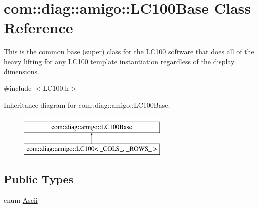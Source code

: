 \hypertarget{classcom_1_1diag_1_1amigo_1_1LC100Base}{
\section{com::diag::amigo::LC100Base Class Reference}
\label{classcom_1_1diag_1_1amigo_1_1LC100Base}
}


This is the common base (super) class for the \hyperlink{classcom_1_1diag_1_1amigo_1_1LC100}{LC100} software that does all of the heavy lifting for any \hyperlink{classcom_1_1diag_1_1amigo_1_1LC100}{LC100} template instantiation regardless of the display dimensions.  




{\ttfamily \#include $<$LC100.h$>$}

Inheritance diagram for com::diag::amigo::LC100Base:\begin{figure}[H]
\begin{center}
\leavevmode
\includegraphics[height=2cm]{classcom_1_1diag_1_1amigo_1_1LC100Base}
\end{center}
\end{figure}
\subsection*{Public Types}
\begin{DoxyCompactItemize}
\item 
enum \hyperlink{classcom_1_1diag_1_1amigo_1_1LC100Base_af03411f6b7c62f305335952ea45b3d51}{Ascii} 
\end{DoxyCompactItemize}
